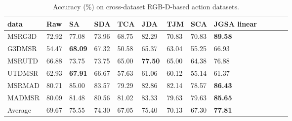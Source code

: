 \documentclass[10pt,twocolumn,letterpaper]{article}
\begin{document}
\begin{table*}[ht!]
\begin{center}
\caption{Accuracy (\%) on cross-dataset RGB-D-based action datasets.}
\label{tab:action}
\begin{small}
\begin{tabular}{ | l | l | l | l | l | l | l | l | l | l | l | l | l | }
\hline
	data & Raw & SA & SDA & TCA & JDA & TJM & SCA & JGSA linear \\\hline \hline
	MSRG3D & 72.92 & 77.08 & 73.96 & 68.75 & 82.29 & 70.83 & 70.83 & \textbf{89.58} \\\hline
	G3DMSR & 54.47 & \textbf{68.09} & 67.32 & 50.58 & 65.37 & 63.04 & 55.25 & 66.93 \\\hline
	MSRUTD & 66.88 & 73.75 & 73.75 & 65.00 & \textbf{77.50} & 65.00 & 64.38 & 76.88 \\\hline
	UTDMSR & 62.93 & \textbf{67.91} & 66.67 & 57.63 & 61.06 & 60.12 & 55.14 & 61.37 \\\hline
	MSRMAD & 80.71 & 85.00 & 83.57 & 79.29 & 82.86 & 82.14 & 78.57 & \textbf{86.43} \\\hline
	MADMSR & 80.09 & 81.48 & 80.56 & 81.02 & 83.33 & 79.63 & 79.63 & \textbf{85.65} \\\hline
	Average & 69.67 & 75.55 & 74.30 & 67.05 & 75.40 & 70.13 & 67.30 & \textbf{77.81} \\\hline

\end{tabular}
\end{small}
\end{center}
\end{table*}
\end{document}
